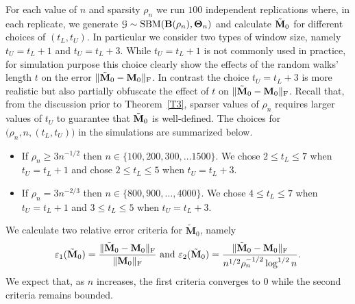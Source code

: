 \documentclass[10pt,journal,compsoc]{IEEEtran}
\newcommand{\M}[1]{{{\mathbf{\MakeUppercase{#1}}}}}
\newcommand{\F}{\mathrm{F}}
\numberwithin{equation}{section}
\begin{document}
For each value of $n$ and sparsity  $\rho_n$ we run $100$
independent replications where, in each replicate, we generate $\mathcal{G} \sim \mathrm{SBM}(\M B(\rho_n),\M \Theta_n)$
and calculate $\tilde{\M M}_0$ for different choices of $(t_L,
t_U)$. In particular we consider two types of window size, namely $t_U = t_L + 1$ and $t_U = t_L + 3$. While $t_U = t_L + 1$ is not commonly used in practice, for simulation purpose this
choice clearly show the effects of the random walks' length $t$ on 
the error $\|\tilde{\M M}_0 - \M M_0\|_\F$. In
contrast the choice $t_U = t_L + 3$ is more realistic but also partially obfuscate the effect of
$t$ on $\|\tilde{\M M}_0 - \M M_0\|_\F$.  Recall that, from
the discussion prior to Theorem~\ref{T3}, sparser values of $\rho_n$ requires larger values of $t_U$ to guarantee that
$\tilde{\M M}_0$ is well-defined. The choices for $\big(\rho_n, n, (t_L, t_U)\big)$ in
the simulations are summarized below.
\begin{itemize}
\item If $\rho_n \geq 3n^{-1/2}$ then $n \in \{100,
200, 300, \dots1500\}$. We chose $2 \leq t_L \leq 7$ when $t_U = t_L + 1$ and chose $2 \leq t_L \leq 5$ when $t_U = t_L + 3$.
\item If $\rho_n = 3n^{-2/3}$ then $n \in \{800, 900, 
\dots, 4000\}$. We chose $4 \leq t_L \leq 7$ when $t_U = t_L + 1$ and
$3 \leq t_L \leq 5$ when
$t_U = t_L + 3$.
\end{itemize}
We calculate two relative error criteria for $\tilde{\mathbf{M}}_0$, namely
\begin{equation*}
  \varepsilon_1(\tilde{\mathbf{M}}_0) = \frac{\|\tilde{\M M}_0 - \M M_0\|_{\F}}{\|\M M_0\|_\F} \,\, \text{and} \,\,
   \varepsilon_2(\tilde{\mathbf{M}}_0) = \frac{\|\tilde{\M M}_0 - \M
    M_0\|_{\F}}{n^{1/2}\rho_n^{-1/2} \log^{1/2}{n}}.
\end{equation*}
We expect that, as $n$ increases, the first criteria converges to $0$ 
while the second criteria remains bounded.
\end{document}
